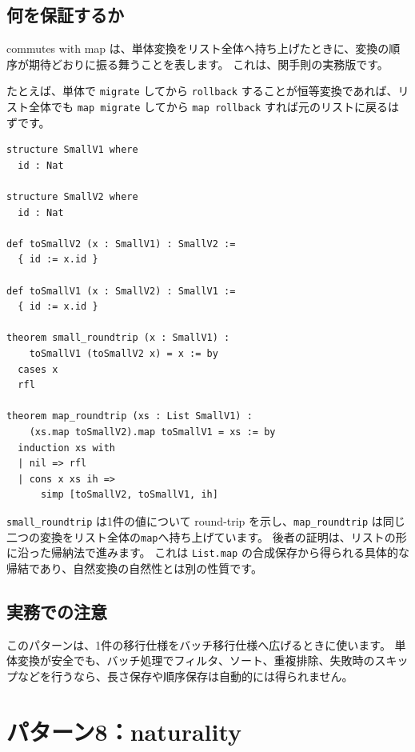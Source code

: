 \subsection{何を保証するか}

commutes with map は、単体変換をリスト全体へ持ち上げたときに、変換の順序が期待どおりに振る舞うことを表します。
これは、関手則の実務版です。

たとえば、単体で \texttt{migrate} してから \texttt{rollback} することが恒等変換であれば、リスト全体でも \texttt{map migrate} してから \texttt{map rollback} すれば元のリストに戻るはずです。

\begin{listing}[htbp]
\begin{verbatim}
structure SmallV1 where
  id : Nat

structure SmallV2 where
  id : Nat

def toSmallV2 (x : SmallV1) : SmallV2 :=
  { id := x.id }

def toSmallV1 (x : SmallV2) : SmallV1 :=
  { id := x.id }

theorem small_roundtrip (x : SmallV1) :
    toSmallV1 (toSmallV2 x) = x := by
  cases x
  rfl

theorem map_roundtrip (xs : List SmallV1) :
    (xs.map toSmallV2).map toSmallV1 = xs := by
  induction xs with
  | nil => rfl
  | cons x xs ih =>
      simp [toSmallV2, toSmallV1, ih]
\end{verbatim}
\caption{\texttt{small\_roundtrip}・\texttt{map\_roundtrip}}
\label{lst:appc_commutes_with_map}
\end{listing}

\texttt{small\_roundtrip} は1件の値について round-trip を示し、\texttt{map\_roundtrip} は同じ二つの変換をリスト全体の\texttt{map}へ持ち上げています。
後者の証明は、リストの形に沿った帰納法で進みます。
これは \texttt{List.map} の合成保存から得られる具体的な帰結であり、自然変換の自然性とは別の性質です。

\subsection{実務での注意}

このパターンは、1件の移行仕様をバッチ移行仕様へ広げるときに使います。
単体変換が安全でも、バッチ処理でフィルタ、ソート、重複排除、失敗時のスキップなどを行うなら、長さ保存や順序保存は自動的には得られません。

\section{パターン8：naturality}

